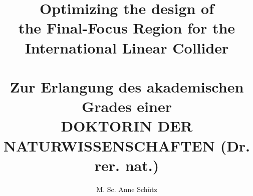 \documentclass[english,final]{sdqthesis}
\author{M. Sc. Anne Sch\"utz}
\title{\LARGE Optimizing the design of\\the Final-Focus Region for the\\International Linear Collider\\
\hfill
\\ \large Zur Erlangung des akademischen Grades einer\\
DOKTORIN DER NATURWISSENSCHAFTEN (Dr. rer. nat.)}
\begin{document}
\setpdf

\maketitle
	
\frontmatter


\end{document}
